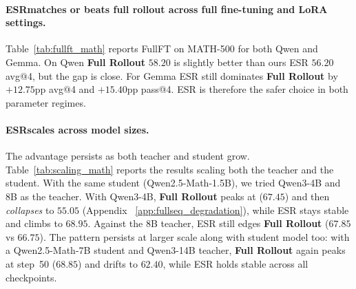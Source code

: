\documentclass{article}
\newcommand{\method}{ESR}
\newcommand{\Method}{ESR}
\begin{document}
\paragraph{\boldmath\method matches or beats full rollout across full fine-tuning and LoRA settings.} Table~\ref{tab:fullft_math} reports FullFT on MATH-500 for both Qwen and Gemma. On Qwen \textbf{Full Rollout} $58.20$ is slightly better than ours \method{} $56.20$ avg@4, but the gap is close. For Gemma \method{} still dominates \textbf{Full Rollout} by $+12.75$pp avg@4 and $+15.40$pp pass@4. \Method{} is therefore the safer choice in both parameter regimes.

\paragraph{\boldmath\method scales across model sizes.} The advantage persists as both teacher and student grow. Table~\ref{tab:scaling_math} reports the results scaling both the teacher and the student. With the same student (Qwen2.5-Math-1.5B), we tried Qwen3-4B and 8B as the teacher. With Qwen3-4B, \textbf{Full Rollout} peaks at ($67.45$) and then \emph{collapses} to $55.05$ (Appendix ~\ref{app:fullseq_degradation}), while \method{} stays stable and climbs to $68.95$. Against the 8B teacher, \method{} still edges \textbf{Full Rollout} ($67.85$ vs $66.75$). The pattern persists at larger scale along with student model too: with a Qwen2.5-Math-7B student and Qwen3-14B teacher, \textbf{Full Rollout} again peaks at step~50 ($68.85$) and drifts to $62.40$, while \method{} holds stable across all checkpoints.
\end{document}
